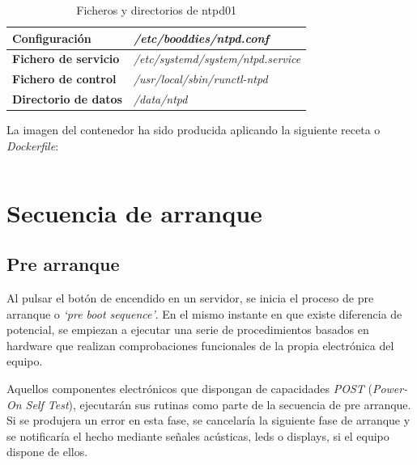 \documentclass[a4paper,12pt,spanish,final]{epsc_tfc_pfc}
\begin{document}
\begin{table}[h]

  \centering

  \begin{tabular}{ll}
    \toprule
    \textbf{Configuración}        & \textit{/etc/booddies/ntpd.conf}          \\
    \midrule
    \rowcolor[HTML]{EFEFEF}
    \textbf{Fichero de servicio}  & \textit{/etc/systemd/system/ntpd.service} \\
    \midrule
    \textbf{Fichero de control}   & \textit{/usr/local/sbin/runctl-ntpd}      \\
    \midrule
    \rowcolor[HTML]{EFEFEF}
    \textbf{Directorio de datos}  & \textit{/data/ntpd}                       \\
    \bottomrule
  \end{tabular}

  \caption{Ficheros y directorios de ntpd01}

\end{table}

La imagen del contenedor ha sido producida aplicando la siguiente receta o \emph{Dockerfile}:\\

\begin{lstlisting}[style=dnsmasq]

\end{lstlisting}


\chapter{Secuencia de arranque}

\section{Pre arranque}
Al pulsar el botón de encendido en un servidor, se inicia el proceso de pre arranque o \emph{`pre boot sequence'}. En el mismo instante en que existe diferencia de potencial, se empiezan a ejecutar una serie de procedimientos basados en hardware que realizan comprobaciones funcionales de la propia electrónica del equipo.

Aquellos componentes electrónicos que dispongan de capacidades \emph{POST} (\emph{Power-On Self Test}), ejecutarán sus rutinas como parte de la secuencia de pre arranque. Si se produjera un error en esta fase, se cancelaría la siguiente fase de arranque y se notificaría el hecho mediante señales acústicas, leds o displays, si el equipo dispone de ellos.
\end{document}
